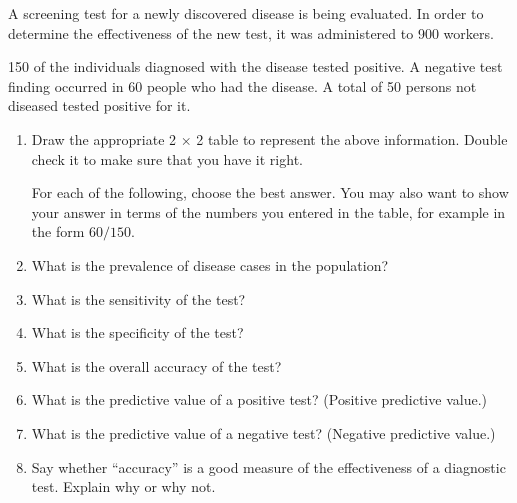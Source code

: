 A screening test for a newly discovered disease is being evaluated.  In order to determine the effectiveness of the new test, it was administered to 900 workers.

150 of the individuals diagnosed with the disease tested positive.  A negative test finding occurred in 60 people who had the disease.  A total of 50 persons not diseased tested positive for it.

\begin{enumerate}

\item Draw the appropriate 2 $\times$ 2 table to represent the above information.  Double check it to make sure that you have it right.

\answerSpace{1.5in}


For each of the following, choose the best answer.  You may also want to show your answer in terms of the numbers you entered in the table, for example in the form  $60/150$.

\item What is the prevalence of disease cases in the population?
\begin{MultipleChoice}[itemname=III-45]
\end{MultipleChoice}

\columnbreak

\item What is the sensitivity of the test?
\begin{MultipleChoice}[itemname=III-46]
\end{MultipleChoice}
\item What is the specificity of the test?
\begin{MultipleChoice}[itemname=III-47]
\end{MultipleChoice}
\item What is the overall accuracy of the test?
\begin{MultipleChoice}[itemname=III-48]
\end{MultipleChoice}
\item What is the predictive value of a positive test? (Positive predictive value.)
\begin{MultipleChoice}[itemname=III-49]
\end{MultipleChoice}
\item What is the predictive value of a negative test? (Negative predictive value.)
\begin{MultipleChoice}[itemname=III-50]
\end{MultipleChoice}
\item Say whether ``accuracy'' is a good measure of the effectiveness of a diagnostic test.  Explain why or why not.
\end{enumerate}

